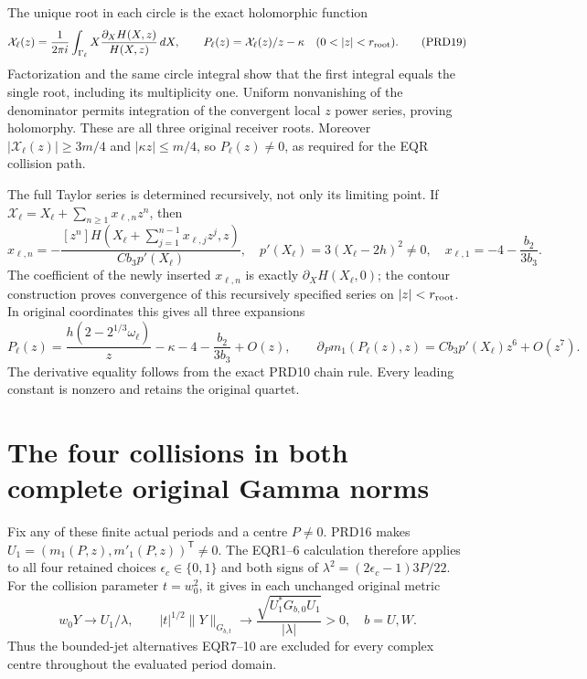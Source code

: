 \documentclass[11pt]{article}
\begin{document}
The unique root in each circle is the exact holomorphic function
\[
 \mathcal X_\ell(z)=\frac1{2\pi i}
       \int_{\Gamma_\ell}
             X\frac{\partial_XH(X,z)}{H(X,z)}\,dX,
 \qquad
 P_\ell(z)=\mathcal X_\ell(z)/z-\kappa
                    \quad(0<|z|<r_{\rm root}).
 \tag{PRD19}
\]
Factorization and the same circle integral show that the first
integral equals the single root, including its multiplicity one.
Uniform nonvanishing of the denominator permits integration of
the convergent local $z$ power series, proving holomorphy.
These are all three original receiver roots. Moreover
$|\mathcal X_\ell(z)|\ge3m/4$ and $|\kappa z|\le m/4$,
so $P_\ell(z)\ne0$, as required for the EQR collision path.

The full Taylor series is determined recursively, not only its
limiting point. If $\mathcal X_\ell=X_\ell+\sum_{n\ge1}x_{\ell,n}z^n$,
then
\[
 x_{\ell,n}=-\frac{[z^n]H(X_\ell+
                     \sum_{j=1}^{n-1}x_{\ell,j}z^j,z)}
                    {Cb_3p'(X_\ell)},\quad
 p'(X_\ell)=3(X_\ell-2h)^2\ne0,
 \quad x_{\ell,1}=-4-\frac{b_2}{3b_3}.
 \tag{PRD20}
\]
The coefficient of the newly inserted $x_{\ell,n}$ is exactly
$\partial_XH(X_\ell,0)$; the contour construction proves convergence
of this recursively specified series on $|z|<r_{\rm root}$.
In original coordinates this gives all three expansions
\[
 P_\ell(z)=\frac{h(2-2^{1/3}\omega_\ell)}z
       -\kappa-4-\frac{b_2}{3b_3}+O(z),\qquad
 \partial_Pm_1(P_\ell(z),z)
       =Cb_3p'(X_\ell)z^6+O(z^7).
 \tag{PRD21}
\]
The derivative equality follows from the exact PRD10 chain rule.
Every leading constant is nonzero and retains the original quartet.

\section{The four collisions in both complete original Gamma norms}
Fix any of these finite actual periods and a centre $P\ne0$.
PRD16 makes $U_1=(m_1(P,z),m'_1(P,z))^{\mathsf T}\ne0$.
The EQR1--6 calculation therefore applies to all four retained
choices $\epsilon_c\in\{0,1\}$ and both signs of
$\lambda^2=(2\epsilon_c-1)3P/22$. For the collision parameter
$t=w_0^2$, it gives in each unchanged original metric
\[
 w_0Y\longrightarrow U_1/\lambda,\qquad
 |t|^{1/2}\|Y\|_{G_{b,t}}
       \longrightarrow\frac{\sqrt{U_1^*G_{b,0}U_1}}{|\lambda|}>0,
                \quad b=U,W.
 \tag{PRD22}
\]
Thus the bounded-jet alternatives EQR7--10 are excluded for every
complex centre throughout the evaluated period domain.
\end{document}
